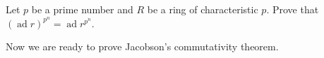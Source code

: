 \begin{exercise}
    Let $p$ be a prime number and $R$ be a ring of characteristic $p$. 
    Prove that $(\operatorname{ad}{r})^{p^n}=\operatorname{ad}{r^{p^n}}$. 
\end{exercise}



Now we are ready to prove Jacobson's commutativity theorem. 

